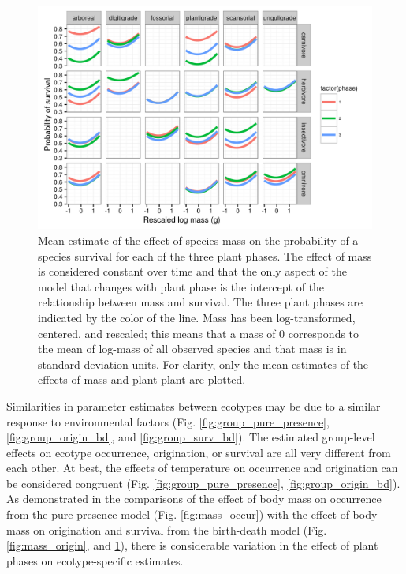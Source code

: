 \begin{figure}[ht]
  \centering
  \includegraphics[width=\textwidth,height=0.4\textheight,keepaspectratio=true]{chapter_coping/figure/mass_on_surv_bd}
  \caption[Effect of mass on probability of species survival as estimated from the birth-death model]{Mean estimate of the effect of species mass on the probability of a species survival for each of the three plant phases. The effect of mass is considered constant over time and that the only aspect of the model that changes with plant phase is the intercept of the relationship between mass and survival. The three plant phases are indicated by the color of the line. Mass has been log-transformed, centered, and rescaled; this means that a mass of 0 corresponds to the mean of log-mass of all observed species and that mass is in standard deviation units. For clarity, only the mean estimates of the effects of mass and plant plant are plotted.}
  \label{fig:mass_survival}
\end{figure}


Similarities in parameter estimates between ecotypes may be due to a similar response to environmental factors (Fig. \ref{fig:group_pure_presence}, \ref{fig:group_origin_bd}, and \ref{fig:group_surv_bd}). The estimated group-level effects on ecotype occurrence, origination, or survival are all very different from each other. At best, the effects of temperature on occurrence and origination can be considered congruent (Fig. \ref{fig:group_pure_presence}, \ref{fig:group_origin_bd}). As demonstrated in the comparisons of the effect of body mass on occurrence from the pure-presence model (Fig. \ref{fig:mass_occur}) with the effect of body mass on origination and survival from the birth-death model (Fig. \ref{fig:mass_origin}, and \ref{fig:mass_survival}), there is considerable variation in the effect of plant phases on ecotype-specific estimates.


